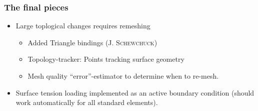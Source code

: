 \documentclass[11pt]{beamer} %
\newcommand{\roughcite}[1]{\textsc{#1}}
\begin{document}
\begin{frame}
\frametitle{The final pieces}
 \begin{itemize}
  \item Large toplogical changes requires remeshing
  \begin{itemize}
  \item Added Triangle bindings (\roughcite{J. Schewchuck})
  \item Topology-tracker: Points tracking surface geometry
  \item Mesh quality ``error''-estimator to determine when to re-mesh.
  \end{itemize}
 \item Surface tension loading implemented as an active boundary condition (should work automatically for all standard elements).
 \end{itemize}
\end{frame}
\end{document}
